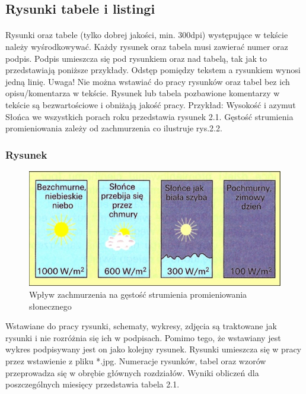 \documentclass[11pt,a4paper]{article}
\begin{document}
\subsection{Rysunki tabele i listingi}

\paragraph{}
Rysunki oraz tabele (tylko dobrej jakości, min. 300dpi) występujące w tekście należy wyśrodkowywać. Każdy rysunek oraz tabela musi zawierać numer oraz podpis. Podpis umieszcza się pod rysunkiem oraz nad tabelą, tak jak to przedstawiają poniższe przykłady. Odstęp pomiędzy tekstem a rysunkiem wynosi jedną linię. Uwaga! Nie można wstawiać do pracy rysunków oraz tabel bez ich opisu/komentarza w tekście. Rysunek lub tabela pozbawione komentarzy w tekście są bezwartościowe i obniżają jakość pracy. 
Przykład: Wysokość i azymut Słońca we wszystkich porach roku przedstawia rysunek 2.1. Gęstość strumienia promieniowania zależy od zachmurzenia co ilustruje rys.2.2.

\subsubsection{Rysunek}
\begin{figure}[H]
    \centering
    \includegraphics[width=0.75\linewidth]{media/zachmurzenie.png}
    \caption{Wpływ zachmurzenia na gęstość strumienia promieniowania słonecznego}
    \label{fig:zachmurzenie}
\end{figure}

Wstawiane do pracy rysunki, schematy, wykresy, zdjęcia są traktowane jak rysunki i nie rozróżnia się ich w podpisach. Pomimo tego, że wstawiany jest wykres podpisywany jest on jako kolejny rysunek. Rysunki umieszcza się w pracy przez wstawienie z pliku *.jpg.
Numeracje rysunków, tabel oraz wzorów przeprowadza się w obrębie głównych rozdziałów. Wyniki obliczeń dla poszczególnych miesięcy przedstawia tabela 2.1.
\end{document}
